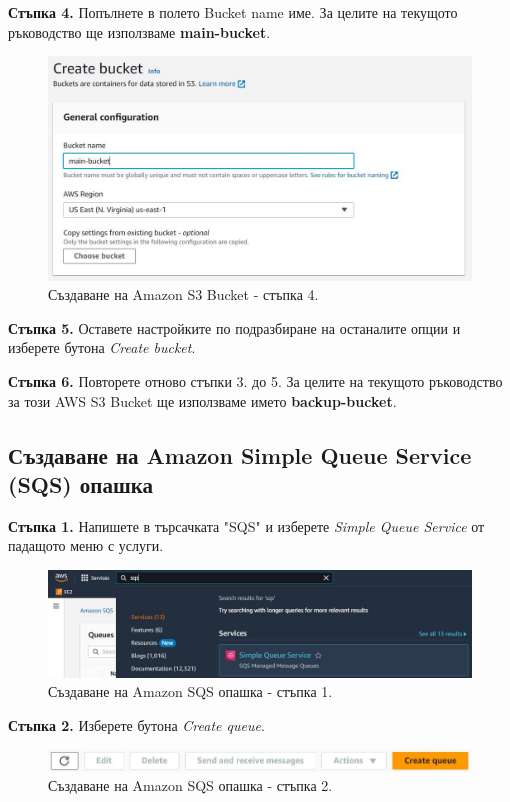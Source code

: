 \documentclass[12pt]{article}
\begin{document}
\noindent\textbf{Стъпка 4.} Попълнете в полето Bucket name име. За целите на текущото ръководство ще използваме \textbf{main-bucket}.
\begin{figure}[h!]
\centering
    \includegraphics[scale=0.6]{instructions/s3/4.JPG}
  \caption{Създаване на Amazon S3 Bucket - стъпка 4.}
\end{figure}

\noindent\textbf{Стъпка 5.} Оставете настройките по подразбиране на останалите опции и изберете бутона \textit{Create bucket}.

\noindent\textbf{Стъпка 6.} Повторете отново стъпки 3. до 5. За целите на текущото ръководство за този AWS S3 Bucket ще използваме името \textbf{backup-bucket}.


\clearpage
\pagebreak

\subsection{Създаване на Amazon Simple Queue Service (SQS) опашка}
\noindent\textbf{Стъпка 1.} Напишете в търсачката "SQS" и изберете \textit{Simple Queue Service} от падащото меню с услуги.
\begin{figure}[h!]
\centering
    \includegraphics[scale=0.5]{instructions/sqs/1.JPG}
  \caption{Създаване на Amazon SQS опашка - стъпка 1.}
\end{figure}

\noindent\textbf{Стъпка 2.} Изберете бутона \textit{Create queue}.
\begin{figure}[h!]
\centering
    \includegraphics[scale=0.55]{instructions/sqs/2.JPG}
  \caption{Създаване на Amazon SQS опашка - стъпка 2.}
\end{figure}
\end{document}

